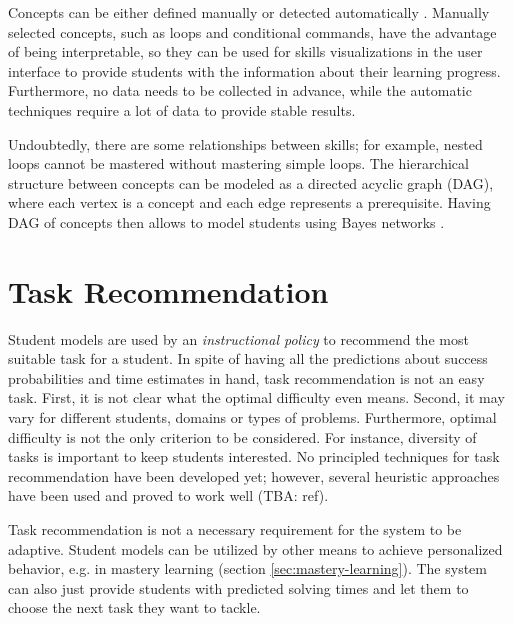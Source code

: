 
Concepts can be either defined manually or detected automatically
  \cite{niznan-thesis}.  %
Manually selected concepts, such as loops and conditional commands,
  have the advantage of being interpretable,
  so they can be used for skills visualizations in the user interface
  to provide students with the information about their learning progress.
Furthermore, no data needs to be collected in advance,
  while the automatic techniques require a lot of data to provide stable results.  %


Undoubtedly, there are some relationships between skills;
  for example, nested loops cannot be mastered without mastering simple loops.
The hierarchical structure between concepts can be modeled
  as a directed acyclic graph (DAG),
  where each vertex is a concept and each edge represents a prerequisite.
Having DAG of concepts then allows to model students using Bayes networks
  \cite{its-programming}.


\section{Task Recommendation}
\label{sec:task-recommendation}

Student models are used by an \emph{instructional policy} to recommend
  the most suitable task for a student.
In spite of having all the predictions about success probabilities
  and time estimates in hand,
  task recommendation is not an easy task.
First, it is not clear what the optimal difficulty even means.
Second, it may vary for different students, domains or types of problems.
Furthermore, optimal difficulty is not the only criterion to be considered.
For instance, diversity of tasks is important to keep students interested.
No principled techniques for task recommendation have been developed yet;
however, several heuristic approaches have been used
  and proved to work well (TBA: ref).

Task recommendation is not a necessary requirement
  for the system to be adaptive.
Student models can be utilized by other means to achieve personalized behavior,
  e.g. in mastery learning (section \ref{sec:mastery-learning}).
The system can also just provide students with predicted solving times
  and let them to choose the next task they want to tackle.

